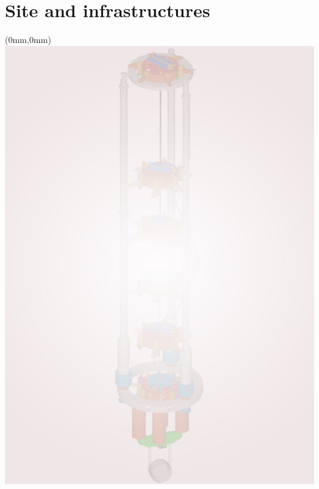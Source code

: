\documentclass[draft,color,DIV12,pdftex,a4paper]{ET-DS}
\begin{document}
\section{Site and infrastructures } \label{sec:SiteInfra}

%
\cleardoublepage 
\FloatBarrier
%
%
\begin{textblock*}{297mm}(0mm,0mm)   \includegraphics[width=\paperwidth]{Sec_Suspensions/Figures/SuspensionBackgroundFirstPage.jpg}
\end{textblock*}
%
\end{document}
